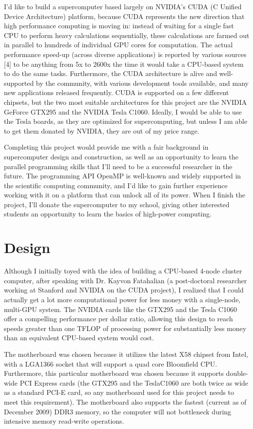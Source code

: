 \documentclass{article}      %
\begin{document}
I'd like to build a supercomputer based largely on NVIDIA's CUDA (C Unified Device Architecture) platform, because CUDA represents the new direction that high performance computing is moving in: instead of waiting for a single fast CPU to perform heavy calculations sequentially, these calculations are farmed out in parallel to hundreds of individual GPU cores for computation. The actual performance speed-up (across diverse applications) is reported by various sources [4] to be anything from 5x to 2600x the time it would take a CPU-based system to do the same tasks.  Furthermore, the CUDA architecture is alive and well-supported by the community, with various development tools available, and many new applications released frequently. CUDA is supported on a few different chipsets, but the two most suitable architectures for this project are the NVIDIA GeForce GTX295 and the NVIDIA Tesla C1060. Ideally, I would be able to use the Tesla boards, as they are optimized for supercomputing, but unless I am able to get them donated by NVIDIA, they are out of my price range.

Completing this project would provide me with a fair background in supercomputer design and construction, as well as an opportunity to learn the parallel programming skills that I'll need to be a successful researcher in the future. The programming API OpenMP is well-known and widely supported in the scientific computing community, and I'd like to gain further experience working with it on a platform that can unlock all of its power. When I finish the project, I'll donate the supercomputer to my school, giving other interested students an opportunity to learn the basics of high-power computing.

\section{Design}
Although I initially toyed with the idea of building a CPU-based 4-node cluster computer, after speaking with Dr. Kayvon Fatahalian (a post-doctoral researcher working at Stanford and NVIDIA on the CUDA project), I realized that I could actually get a lot more computational power for less money with a single-node, multi-GPU system. The NVIDIA cards like the GTX295 and the Tesla C1060 offer a compelling performance per dollar ratio, allowing this design to reach speeds greater than one TFLOP of processing power for substantially less money than an equivalent CPU-based system would cost. 

The motherboard was chosen because it utilizes the latest X58 chipset from Intel, with a LGA1366 socket that will support a quad core Bloomfield CPU. Furthermore, this particular motherboard was chosen because it supports double-wide PCI Express cards (the GTX295 and the TeslaC1060 are both twice as wide as a standard PCI-E card, so any motherboard used for this project needs to meet this requirement). The motherboard also supports the  fastest (current as of December 2009) DDR3 memory, so the computer will not bottleneck during intensive memory read-write operations.
\end{document}

